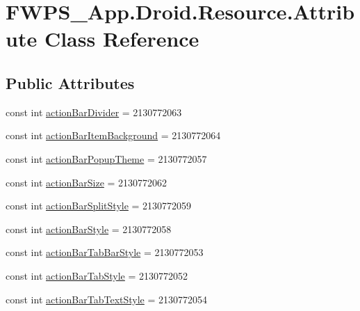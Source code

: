 \hypertarget{class_f_w_p_s___app_1_1_droid_1_1_resource_1_1_attribute}{}\section{F\+W\+P\+S\+\_\+\+App.\+Droid.\+Resource.\+Attribute Class Reference}
\label{class_f_w_p_s___app_1_1_droid_1_1_resource_1_1_attribute}
\subsection*{Public Attributes}
\begin{DoxyCompactItemize}
\item 
const int \mbox{\hyperlink{class_f_w_p_s___app_1_1_droid_1_1_resource_1_1_attribute_a2e7bc346153888781aea535cea2c2538}{action\+Bar\+Divider}} = 2130772063
\item 
const int \mbox{\hyperlink{class_f_w_p_s___app_1_1_droid_1_1_resource_1_1_attribute_a07766f268ba9788b7b184fe8744aab1e}{action\+Bar\+Item\+Background}} = 2130772064
\item 
const int \mbox{\hyperlink{class_f_w_p_s___app_1_1_droid_1_1_resource_1_1_attribute_a0195eaaa821bad4ce3a2281007a74346}{action\+Bar\+Popup\+Theme}} = 2130772057
\item 
const int \mbox{\hyperlink{class_f_w_p_s___app_1_1_droid_1_1_resource_1_1_attribute_ab92d40877a53498917093681f319387f}{action\+Bar\+Size}} = 2130772062
\item 
const int \mbox{\hyperlink{class_f_w_p_s___app_1_1_droid_1_1_resource_1_1_attribute_a7073c42dcdda1b6a8f4e8cd6e948e2fd}{action\+Bar\+Split\+Style}} = 2130772059
\item 
const int \mbox{\hyperlink{class_f_w_p_s___app_1_1_droid_1_1_resource_1_1_attribute_a0b67b4bed6f6580d2a239ab80c76675e}{action\+Bar\+Style}} = 2130772058
\item 
const int \mbox{\hyperlink{class_f_w_p_s___app_1_1_droid_1_1_resource_1_1_attribute_aebe9a0620b9a95cd055aef84248ac3a1}{action\+Bar\+Tab\+Bar\+Style}} = 2130772053
\item 
const int \mbox{\hyperlink{class_f_w_p_s___app_1_1_droid_1_1_resource_1_1_attribute_a17c8ad35d561dc258974dd00e2b395b7}{action\+Bar\+Tab\+Style}} = 2130772052
\item 
const int \mbox{\hyperlink{class_f_w_p_s___app_1_1_droid_1_1_resource_1_1_attribute_a5482fa7a1574e070531f0636463c1e5b}{action\+Bar\+Tab\+Text\+Style}} = 2130772054

\end{DoxyCompactItemize}
